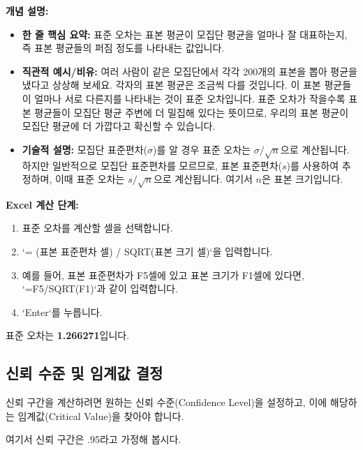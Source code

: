 \documentclass[11pt,a4paper]{article}
\begin{document}
\textbf{개념 설명:}
\begin{itemize}
    \item \textbf{한 줄 핵심 요약:} 표준 오차는 표본 평균이 모집단 평균을 얼마나 잘 대표하는지, 즉 표본 평균들의 퍼짐 정도를 나타내는 값입니다.
    \item \textbf{직관적 예시/비유:} 여러 사람이 같은 모집단에서 각각 200개의 표본을 뽑아 평균을 냈다고 상상해 보세요. 각자의 표본 평균은 조금씩 다를 것입니다. 이 표본 평균들이 얼마나 서로 다른지를 나타내는 것이 표준 오차입니다. 표준 오차가 작을수록 표본 평균들이 모집단 평균 주변에 더 밀집해 있다는 뜻이므로, 우리의 표본 평균이 모집단 평균에 더 가깝다고 확신할 수 있습니다.
    \item \textbf{기술적 설명:} 모집단 표준편차($\sigma$)를 알 경우 표준 오차는 $\sigma / \sqrt{n}$으로 계산됩니다. 하지만 일반적으로 모집단 표준편차를 모르므로, 표본 표준편차($s$)를 사용하여 추정하며, 이때 표준 오차는 $s / \sqrt{n}$으로 계산됩니다. 여기서 $n$은 표본 크기입니다.
\end{itemize}

\textbf{Excel 계산 단계:}
\begin{enumerate}
    \item 표준 오차를 계산할 셀을 선택합니다.
    \item `= (표본 표준편차 셀) / SQRT(표본 크기 셀)`을 입력합니다.
    \item 예를 들어, 표본 표준편차가 F5셀에 있고 표본 크기가 F1셀에 있다면, `=F5/SQRT(F1)`과 같이 입력합니다.
    \item `Enter`를 누릅니다.
\end{enumerate}
\begin{tcolorbox}[colback=mygreen!10!white, colframe=mygreen!75!black, title=계산 결과: 표준 오차]
표준 오차는 \textbf{1.266271}입니다.
\end{tcolorbox}

\subsection{신뢰 수준 및 임계값 결정}

신뢰 구간을 계산하려면 원하는 신뢰 수준(Confidence Level)을 설정하고, 이에 해당하는 임계값(Critical Value)을 찾아야 합니다.

\begin{tcolorbox}[title=슬라이드 39: 뉴욕 일일 기온 샘플 Excel 시트 (8/22)]
여기서 신뢰 구간은 .95라고 가정해 봅시다.
\end{tcolorbox}
\end{document}
